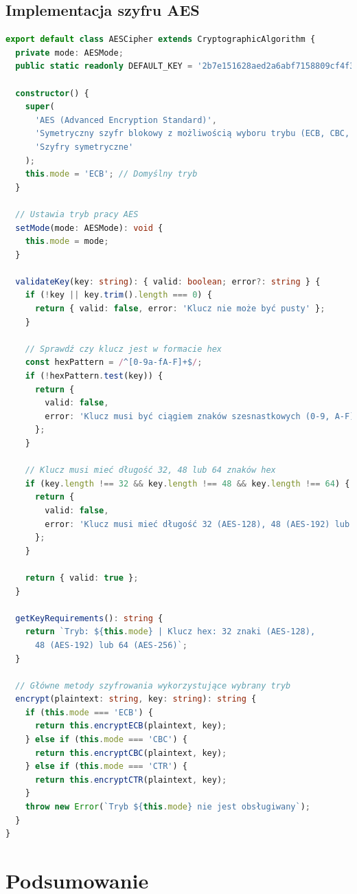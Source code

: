 \documentclass[12pt,a4paper]{article}
\begin{document}
\subsection{Implementacja szyfru AES}
\begin{lstlisting}[language=TypeScript, caption={Fragmenty klasy AESCipher}]
export default class AESCipher extends CryptographicAlgorithm {
  private mode: AESMode;
  public static readonly DEFAULT_KEY = '2b7e151628aed2a6abf7158809cf4f3c';

  constructor() {
    super(
      'AES (Advanced Encryption Standard)',
      'Symetryczny szyfr blokowy z możliwością wyboru trybu (ECB, CBC, CTR)',
      'Szyfry symetryczne'
    );
    this.mode = 'ECB'; // Domyślny tryb
  }

  // Ustawia tryb pracy AES
  setMode(mode: AESMode): void {
    this.mode = mode;
  }

  validateKey(key: string): { valid: boolean; error?: string } {
    if (!key || key.trim().length === 0) {
      return { valid: false, error: 'Klucz nie może być pusty' };
    }

    // Sprawdź czy klucz jest w formacie hex
    const hexPattern = /^[0-9a-fA-F]+$/;
    if (!hexPattern.test(key)) {
      return { 
        valid: false, 
        error: 'Klucz musi być ciągiem znaków szesnastkowych (0-9, A-F)' 
      };
    }

    // Klucz musi mieć długość 32, 48 lub 64 znaków hex
    if (key.length !== 32 && key.length !== 48 && key.length !== 64) {
      return {
        valid: false,
        error: 'Klucz musi mieć długość 32 (AES-128), 48 (AES-192) lub 64 (AES-256)'
      };
    }

    return { valid: true };
  }

  getKeyRequirements(): string {
    return `Tryb: ${this.mode} | Klucz hex: 32 znaki (AES-128), 
      48 (AES-192) lub 64 (AES-256)`;
  }

  // Główne metody szyfrowania wykorzystujące wybrany tryb
  encrypt(plaintext: string, key: string): string {
    if (this.mode === 'ECB') {
      return this.encryptECB(plaintext, key);
    } else if (this.mode === 'CBC') {
      return this.encryptCBC(plaintext, key);
    } else if (this.mode === 'CTR') {
      return this.encryptCTR(plaintext, key);
    }
    throw new Error(`Tryb ${this.mode} nie jest obsługiwany`);
  }
}
\end{lstlisting}

\section{Podsumowanie}
\end{document}
